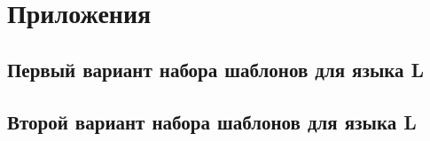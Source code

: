 \setcounter{subsection}{0}
\renewcommand\thesubsection{\Alph{subsection}}

\section*{Приложения}
\subsection{Первый вариант набора шаблонов для языка L}
\label{app:1}


\subsection{Второй вариант набора шаблонов для языка L}
\label{app:2}



\renewcommand\thesubsection{\arabic{subsection}}
